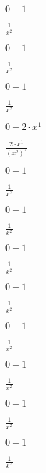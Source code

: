 $0+1$

$ \frac{1}{x^{2}} $

$0+1$

$ \frac{1}{x^{2}} $

$0+1$

$ \frac{1}{x^{2}} $

$0+2 \cdot x^{1}$

$ \frac{2 \cdot x^{1}}{(x^{2})^{2}} $

$0+1$

$ \frac{1}{x^{2}} $

$0+1$

$ \frac{1}{x^{2}} $

$0+1$

$ \frac{1}{x^{2}} $

$0+1$

$ \frac{1}{x^{2}} $

$0+1$

$ \frac{1}{x^{2}} $

$0+1$

$ \frac{1}{x^{2}} $

$0+1$

$ \frac{1}{x^{2}} $

$0+1$

$ \frac{1}{x^{2}} $

